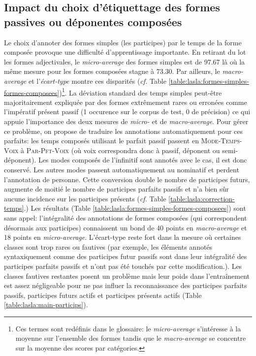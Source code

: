 \subsection{Impact du choix d'étiquettage des formes passives ou déponentes composées}
\label{subsec:training:lasla-modification}

Le choix d'annoter des formes simples (les participes) par le temps de la forme composée provoque une difficulté d'apprentissage importante. En retirant du lot les formes adjectivales, le \textit{micro-average} des formes simples est de 97.67 là où la même mesure pour les formes composées stagne à 73.30. Par ailleurs, le \textit{macro-average} et l'\textit{écart-type} montre ces disparités (\textit{cf.} Table \ref{table:lasla:formes-simples-formes-composees})\footnote{Ces termes sont redéfinis dans le glossaire: le \textit{micro-average} s'intéresse à la moyenne sur l'ensemble des formes tandis que le \textit{macro-average} se concentre sur la moyenne des scores par catégories.}. La déviation standard des temps simples peut-être majoritairement expliquée par des formes extrêmement rares ou erronées comme l'impératif présent passif (1 occurence sur le corpus de test, 0 de précision) ce qui appuie l'importance des deux mesures de \textit{micro-} et de \textit{macro-average}. Pour gérer ce problème, on propose de traduire les annotations automatiquement pour ces parfaits: les temps composés utilisant le parfait passif passent en \textsc{Mode-Temps-Voix} à \textsc{Par-Pft-Voix} (où voix correspondra donc à passif, déponent ou semi-déponent). Les modes composés de l'infinitif sont annotés avec le cas, il est donc conservé. Les autres modes passent automatiquement au nominatif et perdent l'annotation de personne. Cette conversion double le nombre de participes futurs, augmente de moitié le nombre de participes parfaits passifs et n'a bien sûr aucune incidence sur les participes présents (\textit{cf.} Table \ref{table:lasla:correction-temps}.) Les résultats (Table \ref{table:lasla:formes-simples-formes-composees}) sont sans appel: l'intégralité des annotations de formes composées (qui correspondent désormais aux participes) connaissent un bond de 40 points en \textit{macro-average} et 18 points en \textit{micro-average}. L'écart-type reste fort dans la mesure où certaines classes sont trop rares ou fautives (par exemple, les éléments annotés syntaxiquement comme des participes futur passifs sont dans leur intégralité des participes parfaits passifs et n'ont pas été touchés par cette modification.). Les classes fautives restantes posent un problème mais leur poids dans l'entraînement est assez négligeable pour ne pas influer la reconnaissance des participes parfaits passifs, participes futurs actifs et participes présents actifs (Table \ref{table:lasla:main-particips}).

